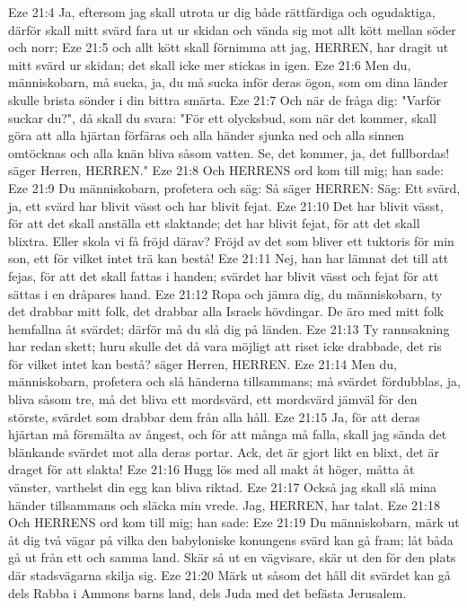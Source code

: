 Eze 21:4  Ja, eftersom jag skall utrota ur dig både rättfärdiga och ogudaktiga, därför skall mitt svärd fara ut ur skidan och vända sig mot allt kött mellan söder och norr;
Eze 21:5  och allt kött skall förnimma att jag, HERREN, har dragit ut mitt svärd ur skidan; det skall icke mer stickas in igen.
Eze 21:6  Men du, människobarn, må sucka, ja, du må sucka inför deras ögon, som om dina länder skulle brista sönder i din bittra smärta.
Eze 21:7  Och när de fråga dig: "Varför suckar du?", då skall du svara: "För ett olycksbud, som när det kommer, skall göra att alla hjärtan förfäras och alla händer sjunka ned och alla sinnen omtöcknas och alla knän bliva såsom vatten. Se, det kommer, ja, det fullbordas! säger Herren, HERREN."
Eze 21:8  Och HERRENS ord kom till mig; han sade:
Eze 21:9  Du människobarn, profetera och säg: Så säger HERREN: Säg: Ett svärd, ja, ett svärd har blivit vässt och har blivit fejat.
Eze 21:10  Det har blivit vässt, för att det skall anställa ett slaktande; det har blivit fejat, för att det skall blixtra. Eller skola vi få fröjd därav? Fröjd av det som bliver ett tuktoris för min son, ett för vilket intet trä kan bestå!
Eze 21:11  Nej, han har lämnat det till att fejas, för att det skall fattas i handen; svärdet har blivit vässt och fejat för att sättas i en dråpares hand.
Eze 21:12  Ropa och jämra dig, du människobarn, ty det drabbar mitt folk, det drabbar alla Israels hövdingar. De äro med mitt folk hemfallna åt svärdet; därför må du slå dig på länden.
Eze 21:13  Ty rannsakning har redan skett; huru skulle det då vara möjligt att riset icke drabbade, det ris för vilket intet kan bestå? säger Herren, HERREN.
Eze 21:14  Men du, människobarn, profetera och slå händerna tillsammans; må svärdet fördubblas, ja, bliva såsom tre, må det bliva ett mordsvärd, ett mordsvärd jämväl för den störste, svärdet som drabbar dem från alla håll.
Eze 21:15  Ja, för att deras hjärtan må försmälta av ångest, och för att många må falla, skall jag sända det blänkande svärdet mot alla deras portar. Ack, det är gjort likt en blixt, det är draget för att slakta!
Eze 21:16  Hugg lös med all makt åt höger, måtta åt vänster, varthelst din egg kan bliva riktad.
Eze 21:17  Också jag skall slå mina händer tillsammans och släcka min vrede. Jag, HERREN, har talat.
Eze 21:18  Och HERRENS ord kom till mig; han sade:
Eze 21:19  Du människobarn, märk ut åt dig två vägar på vilka den babyloniske konungens svärd kan gå fram; låt båda gå ut från ett och samma land. Skär så ut en vägvisare, skär ut den för den plats där stadsvägarna skilja sig.
Eze 21:20  Märk ut såsom det håll dit svärdet kan gå dels Rabba i Ammons barns land, dels Juda med det befästa Jerusalem.

